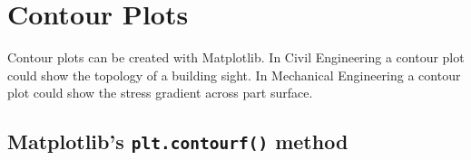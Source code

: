 \documentclass{book}
\begin{document}
    \begin{center}
    \end{center}
    { \hspace*{\fill} \\}
    
    \begin{center}
    \end{center}
    { \hspace*{\fill} \\}
    
    \begin{center}
    \end{center}
    { \hspace*{\fill} \\}
    
    \begin{center}
    \end{center}
    { \hspace*{\fill} \\}
    
    \begin{center}
    \end{center}
    { \hspace*{\fill} \\}
    

    
        \hypertarget{contour-plots}{%
\section{Contour Plots}\label{contour-plots}}
    




    
        Contour plots can be created with Matplotlib. In Civil Engineering a
contour plot could show the topology of a building sight. In Mechanical
Engineering a contour plot could show the stress gradient across part
surface.
    




    
        \hypertarget{matplotlibs-plt.contourf-method}{%
\subsection{\texorpdfstring{Matplotlib's \texttt{plt.contourf()}
method}{Matplotlib's plt.contourf() method}}\label{matplotlibs-plt.contourf-method}}
    
\end{document}
